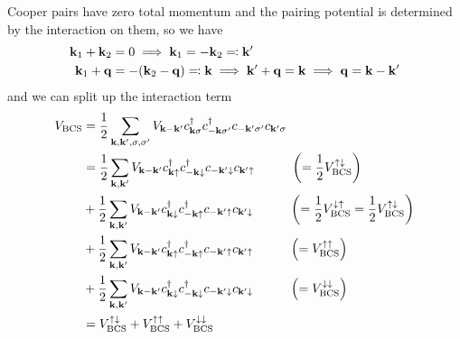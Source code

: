 Cooper pairs have zero total momentum and the pairing potential is determined by the interaction on them, so we have
\begin{align}
    \mathbf{k}_1 + \mathbf{k}_2 &= 0 \implies \mathbf{k}_1 = - \mathbf{k}_2 \eqcolon \mathbf{k}^{\prime} \\
    \mathbf{k}_1 + \mathbf{q} &= -(\mathbf{k}_2 - \mathbf{q}) \eqcolon \mathbf{k} \implies \mathbf{k}^{\prime} + \mathbf{q} = \mathbf{k} \implies \mathbf{q} = \mathbf{k} - \mathbf{k}^{\prime}
\end{align}
and we can split up the interaction term
\begin{align}
    V_{\text{BCS}} &= \frac{1}{2} \sum_{\mathbf{k}, \mathbf{k}^{\prime}, \sigma, \sigma^{\prime}} V_{\mathbf{k}-\mathbf{k}^{\prime}} c_{\mathbf{k} \sigma}^{\dagger} c_{-\mathbf{k} \sigma^{\prime}}^{\dagger} c_{-\mathbf{k}^{\prime} \sigma^{\prime}} c_{\mathbf{k}^{\prime} \sigma} \\
    &= \frac{1}{2} \sum_{\mathbf{k}, \mathbf{k}^{\prime}} V_{\mathbf{k}-\mathbf{k}^{\prime}} c_{\mathbf{k} \uparrow}^{\dagger} c_{-\mathbf{k} \downarrow}^{\dagger} c_{-\mathbf{k}^{\prime} \downarrow} c_{\mathbf{k}^{\prime} \uparrow} \hspace{1cm} \left(= \frac{1}{2} V_{\text{BCS}}^{\uparrow \downarrow}  \right)\\
    &+ \frac{1}{2} \sum_{\mathbf{k}, \mathbf{k}^{\prime}} V_{\mathbf{k}-\mathbf{k}^{\prime}} c_{\mathbf{k} \downarrow}^{\dagger} c_{-\mathbf{k} \uparrow}^{\dagger} c_{-\mathbf{k}^{\prime} \uparrow} c_{\mathbf{k}^{\prime} \downarrow} \hspace{1cm} \left(= \frac{1}{2} V_{\text{BCS}}^{\downarrow \uparrow} = \frac{1}{2} V_{\text{BCS}}^{\uparrow \downarrow} \right)\\
    &+ \frac{1}{2} \sum_{\mathbf{k}, \mathbf{k}^{\prime}} V_{\mathbf{k}-\mathbf{k}^{\prime}} c_{\mathbf{k} \uparrow}^{\dagger} c_{-\mathbf{k} \uparrow}^{\dagger} c_{-\mathbf{k}^{\prime} \uparrow} c_{\mathbf{k}^{\prime} \uparrow} \hspace{1cm} \left(= V_{\text{BCS}}^{\uparrow \uparrow} \right)\\
    &+ \frac{1}{2} \sum_{\mathbf{k}, \mathbf{k}^{\prime}} V_{\mathbf{k}-\mathbf{k}^{\prime}} c_{\mathbf{k} \downarrow}^{\dagger} c_{-\mathbf{k} \downarrow}^{\dagger} c_{-\mathbf{k}^{\prime} \downarrow} c_{\mathbf{k}^{\prime} \downarrow} \hspace{1cm} \left(= V_{\text{BCS}}^{\downarrow \downarrow} \right) \\
    &= V_{\text{BCS}}^{\uparrow \downarrow} + V_{\text{BCS}}^{\uparrow \uparrow} + V_{\text{BCS}}^{\downarrow \downarrow}
\end{align}

